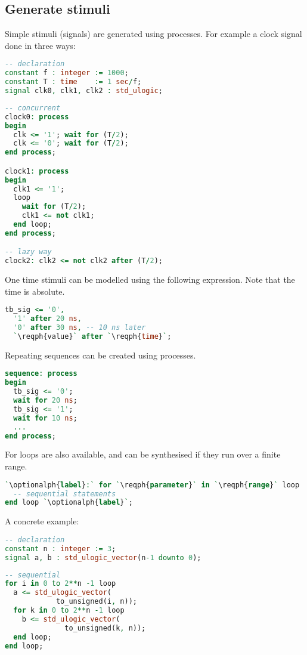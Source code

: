 \subsection{Generate stimuli} \label{sec:stimuli}
Simple stimuli (signals) are generated using processes. For example a clock
signal done in three ways:
\begin{lstlisting}[language=vhdl]
-- declaration
constant f : integer := 1000;
constant T : time    := 1 sec/f;
signal clk0, clk1, clk2 : std_ulogic;
\end{lstlisting}
\begin{lstlisting}[language=vhdl]
-- concurrent
clock0: process
begin
  clk <= '1'; wait for (T/2);
  clk <= '0'; wait for (T/2);
end process;

clock1: process
begin
  clk1 <= '1';
  loop
    wait for (T/2);
    clk1 <= not clk1;
  end loop;
end process;

-- lazy way
clock2: clk2 <= not clk2 after (T/2);
\end{lstlisting}
One time stimuli can be modelled using the following expression. Note that the
time is absolute.
\begin{lstlisting}[language=vhdl]
tb_sig <= '0',
  '1' after 20 ns,
  '0' after 30 ns, -- 10 ns later
  `\reqph{value}` after `\reqph{time}`;
\end{lstlisting}
Repeating sequences can be created using processes.
\begin{lstlisting}[language=vhdl]
sequence: process
begin
  tb_sig <= '0';
  wait for 20 ns;
  tb_sig <= '1';
  wait for 10 ns;
  ...
end process;
\end{lstlisting}
For loops are also available, and can be synthesised if they run over a finite
range.
\begin{lstlisting}[language=vhdl]
`\optionalph{label}:` for `\reqph{parameter}` in `\reqph{range}` loop
  -- sequential statements
end loop `\optionalph{label}`;
\end{lstlisting}
A concrete example:
\begin{lstlisting}[language=vhdl]
-- declaration
constant n : integer := 3;
signal a, b : std_ulogic_vector(n-1 downto 0);
\end{lstlisting}
\begin{lstlisting}[language=vhdl]
-- sequential
for i in 0 to 2**n -1 loop
  a <= std_ulogic_vector(
            to_unsigned(i, n));
  for k in 0 to 2**n -1 loop
    b <= std_ulogic_vector(
              to_unsigned(k, n));
  end loop;
end loop;
\end{lstlisting}

